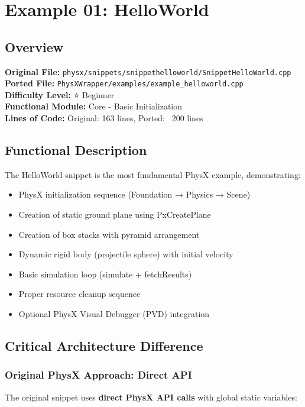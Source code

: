 \section{Example 01: HelloWorld}
\label{sec:example_helloworld}

\subsection{Overview}
\textbf{Original File:} \texttt{physx/snippets/snippethelloworld/SnippetHelloWorld.cpp} \\
\textbf{Ported File:} \texttt{PhysXWrapper/examples/example\_helloworld.cpp} \\
\textbf{Difficulty Level:} ⭐ Beginner \\
\textbf{Functional Module:} Core - Basic Initialization \\
\textbf{Lines of Code:} Original: 163 lines, Ported: ~200 lines

\subsection{Functional Description}
The HelloWorld snippet is the most fundamental PhysX example, demonstrating:
\begin{itemize}
    \item PhysX initialization sequence (Foundation → Physics → Scene)
    \item Creation of static ground plane using PxCreatePlane
    \item Creation of box stacks with pyramid arrangement
    \item Dynamic rigid body (projectile sphere) with initial velocity
    \item Basic simulation loop (simulate + fetchResults)
    \item Proper resource cleanup sequence
    \item Optional PhysX Visual Debugger (PVD) integration
\end{itemize}

\subsection{Critical Architecture Difference}

\subsubsection{Original PhysX Approach: Direct API}
The original snippet uses \textbf{direct PhysX API calls} with global static variables:

